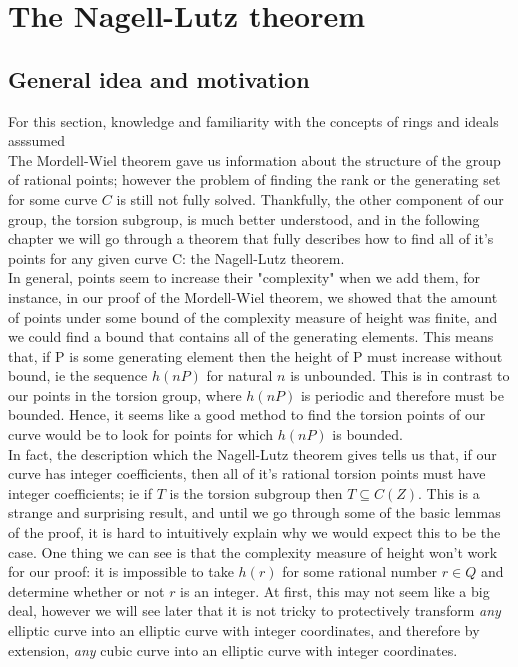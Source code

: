 \documentclass{article}
\begin{document}
\newpage

\section{The Nagell-Lutz theorem}

\subsection{General idea and motivation}

For this section, knowledge and familiarity with the concepts of rings and ideals asssumed\\

The Mordell-Wiel theorem gave us information about the structure of the group of rational points; however the problem of finding the rank or the generating set for some curve $C$ is still not fully solved. Thankfully, the other component of our group, the torsion subgroup, is much better understood, and in the following chapter we will go through a theorem that fully describes how to find all of it's points for any given curve C: the Nagell-Lutz theorem.\\

In general, points seem to increase their "complexity" when we add them, for instance, in our proof of the Mordell-Wiel theorem, we showed that the amount of points under some bound of the complexity measure of height was finite, and we could find a bound that contains all of the generating elements. This means that, if P is some generating element then the height of P must increase without bound, ie the sequence $h(nP)$ for natural $n$ is unbounded. This is in contrast to our points in the torsion group, where $h(nP)$ is periodic and therefore must be bounded. Hence, it seems like a good method to find the torsion points of our curve would be to look for points for which $h(nP)$ is bounded.\\

In fact, the description which the Nagell-Lutz theorem gives tells us that, if our curve has integer coefficients, then all of it's rational torsion points must have integer coefficients; ie if $T$ is the torsion subgroup then $T \subseteq C(Z)$. This is a strange and surprising result, and until we go through some of the basic lemmas of the proof, it is hard to intuitively explain why we would expect this to be the case. One thing we can see is that the complexity measure of height won't work for our proof: it is impossible to take $h(r)$ for some rational number $r \in Q$ and determine whether or not $r$ is an integer. At first, this may not seem like a big deal, however we will see later that it is not tricky to protectively transform \emph{any} elliptic curve into an elliptic curve with integer coordinates, and therefore by extension, \emph{any} cubic curve into an elliptic curve with integer coordinates.\\
\end{document}
